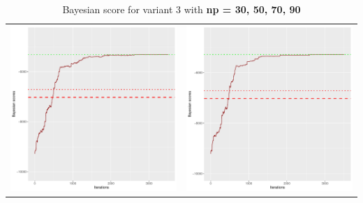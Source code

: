 \documentclass[]{scrartcl}
\begin{document}
\begin{table}[h!]
\begin{tabular}{cc}
\includegraphics[scale = 0.4]{./figs/alarm/v3/70/bayBoundsEvolution-3502.pdf} & 
\includegraphics[scale = 0.4]{./figs/alarm/v3/90/bayBoundsEvolution-3502.pdf} \\
\end{tabular}
\caption{Bayesian score for variant 3 with \textbf{np =  30, 50, 70, 90 }}
\end{table}
\end{document}
